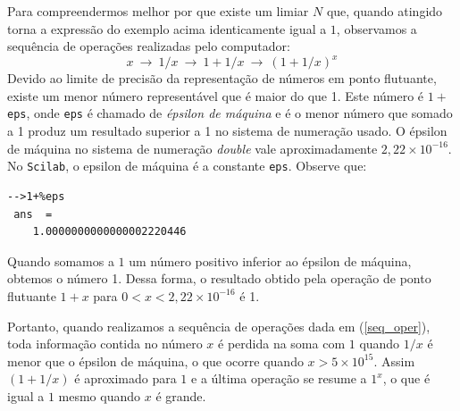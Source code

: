 \documentclass[main.tex]{subfiles}
\begin{document}
Para compreendermos melhor por que existe um limiar $N$ que, quando atingido torna a expressão do exemplo acima identicamente igual a $1$, observamos a sequência de operações realizadas pelo computador:
\begin{equation}\label{seq_oper}
x~\to ~1/x ~\to ~1+1/x ~\to ~(1+1/x)^x
\end{equation}
Devido ao limite de precisão da representação de números em ponto flutuante, existe um menor número representável que é maior do que 1. Este número é $1 + $\verb+eps+, onde \verb+eps+ é chamado de \emph{épsilon de máquina} e é o menor número que somado a 1 produz um resultado superior a 1 no sistema de numeração usado. O épsilon de máquina no sistema de numeração \emph{double} vale aproximadamente $2,22\times 10^{-16}$.
\ifisscilab
No \verb+Scilab+, o epsilon de máquina é a constante \verb+eps+. Observe que:
\begin{verbatim}
-->1+%eps
 ans  =
    1.0000000000000002220446 
\end{verbatim}
\fi
Quando somamos a $1$ um número positivo inferior ao épsilon de máquina, obtemos o número 1. Dessa forma, o resultado obtido pela operação de ponto flutuante $1+x$ para $0<x<2,22 \times 10^{-16}$ é 1. 

Portanto, quando realizamos a sequência de operações dada em (\ref{seq_oper}), toda informação contida no número $x$ é perdida na soma com $1$ quando $1/x$ é menor que o épsilon de máquina, o que ocorre quando $x>5\times 10^{15}$. Assim $(1+1/x)$ é aproximado para $1$ e a última operação se resume a $1^x$, o que é igual a $1$ mesmo quando $x$ é grande.
\end{document}
